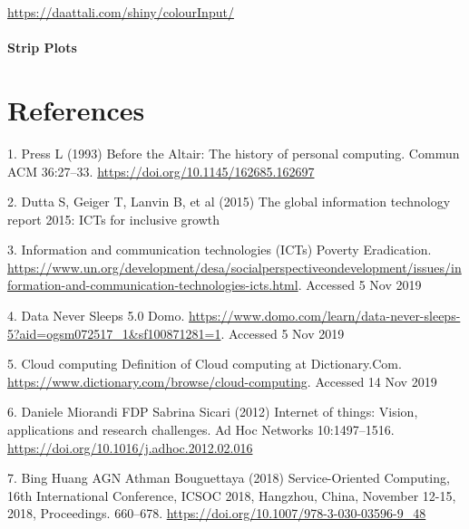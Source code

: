 \documentclass[11pt,]{article}
\let\oldparagraph\paragraph
\renewcommand{\paragraph}[1]{\oldparagraph{#1}\mbox{}}
\begin{document}
\url{https://daattali.com/shiny/colourInput/}

\hypertarget{strip-plots}{%
\paragraph{Strip Plots}\label{strip-plots}}

\hypertarget{references}{%
\section*{References}\label{references}}

\hypertarget{refs}{}
\leavevmode\hypertarget{ref-pressAltairHistoryPersonal1993}{}%
1. Press L (1993) Before the Altair: The history of personal computing.
Commun ACM 36:27--33. \url{https://doi.org/10.1145/162685.162697}

\leavevmode\hypertarget{ref-duttaGlobalInformationTechnology2015}{}%
2. Dutta S, Geiger T, Lanvin B, et al (2015) The global information
technology report 2015: ICTs for inclusive growth

\leavevmode\hypertarget{ref-InformationCommunicationTechnologies}{}%
3. Information and communication technologies (ICTs) \textbar{} Poverty
Eradication.
\url{https://www.un.org/development/desa/socialperspectiveondevelopment/issues/information-and-communication-technologies-icts.html}.
Accessed 5 Nov 2019

\leavevmode\hypertarget{ref-DataNeverSleeps}{}%
4. Data Never Sleeps 5.0 \textbar{} Domo.
\url{https://www.domo.com/learn/data-never-sleeps-5?aid=ogsm072517_1\&sf100871281=1}.
Accessed 5 Nov 2019

\leavevmode\hypertarget{ref-CloudComputingDefinition}{}%
5. Cloud computing \textbar{} Definition of Cloud computing at
Dictionary.Com. \url{https://www.dictionary.com/browse/cloud-computing}.
Accessed 14 Nov 2019

\leavevmode\hypertarget{ref-danielemiorandiInternetThingsVision2012}{}%
6. Daniele Miorandi FDP Sabrina Sicari (2012) Internet of things:
Vision, applications and research challenges. Ad Hoc Networks
10:1497--1516. \url{https://doi.org/10.1016/j.adhoc.2012.02.016}

\leavevmode\hypertarget{ref-binghuangServiceOrientedComputing16th2018}{}%
7. Bing Huang AGN Athman Bouguettaya (2018) Service-Oriented Computing,
16th International Conference, ICSOC 2018, Hangzhou, China, November
12-15, 2018, Proceedings. 660--678.
\url{https://doi.org/10.1007/978-3-030-03596-9_48}
\end{document}
